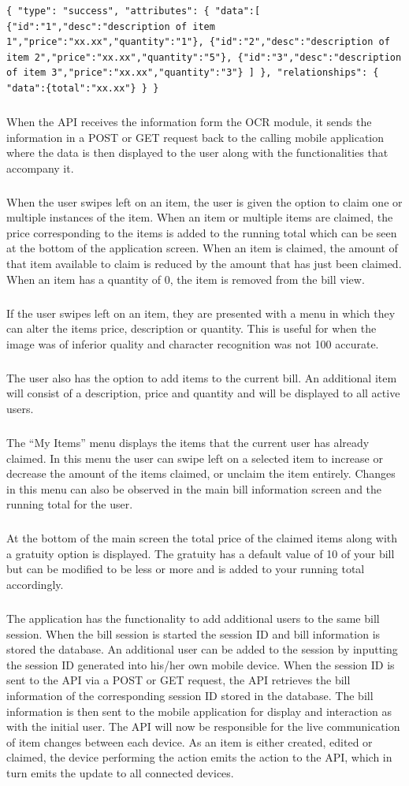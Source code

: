 \documentclass[12pt,a4paper]{article}
\begin{document}
\begin{lstlisting}
{ "type": "success", "attributes": { "data":[ {"id":"1","desc":"description of item 1","price":"xx.xx","quantity":"1"}, {"id":"2","desc":"description of item 2","price":"xx.xx","quantity":"5"}, {"id":"3","desc":"description of item 3","price":"xx.xx","quantity":"3"} ] }, "relationships": { "data":{total":"xx.xx"} } }
\end{lstlisting}

\subparagraph{}
When the API receives the information form the OCR module, it sends the information in a POST or GET request back to the calling mobile application where the data is then displayed to the user along with the functionalities that accompany it. 
\subparagraph{}
When the user swipes left on an item, the user is given the option to claim one or multiple instances of the item. When an item or multiple items are claimed, the price corresponding to the items is added to the running total which can be seen at the bottom of the application screen. When an item is claimed, the amount of that item available to claim is reduced by the amount that has just been claimed. When an item has a quantity of 0, the item is removed from the bill view. 
\subparagraph{}
If the user swipes left on an item, they are presented with a menu in which they can alter the items price, description or quantity. This is useful for when the image was of inferior quality and character recognition was not 100 accurate. 
\subparagraph{}
The user also has the option to add items to the current bill. An additional item will consist of a description, price and quantity and will be displayed to all active users. 
\subparagraph{}
The “My Items” menu displays the items that the current user has already claimed. In this menu the user can swipe left on a selected item to increase or decrease the amount of the items claimed, or unclaim the item entirely. Changes in this menu can also be observed in the main bill information screen and the running total for the user. 
\subparagraph{}
At the bottom of the main screen the total price of the claimed items along with a gratuity option is displayed. The gratuity has a default value of 10 of your bill but can be modified to be less or more and is added to your running total accordingly.
\subparagraph{}
The application has the functionality to add additional users to the same bill session. When the bill session is started the session ID and bill information is stored the database. An additional user can be added to the session by inputting the session ID generated into his/her own mobile device. When the session ID is sent to the API via a POST or GET request, the API retrieves the bill information of the corresponding session ID stored in the database. The bill information is then sent to the mobile application for display and interaction as with the initial user. The API will now be responsible for the live communication of item changes between each device. As an item is either created, edited or claimed, the device performing the action emits the action to the API, which in turn emits the update to all connected devices.  
\end{document}
